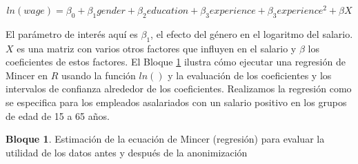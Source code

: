 \documentclass[
]{book}
\theoremstyle{definition}
\theoremstyle{definition}
\newtheorem{example}{Bloque}[chapter]
\theoremstyle{definition}
\theoremstyle{definition}
\theoremstyle{remark}
\begin{document}
\[ln(wage)=β_0+β_1gender+β_2education+β_3experience+β_3experience^2+βX\]

El parámetro de interés aquí es \(β_1\), el efecto del género en el logaritmo del salario. \(X\) es una matriz con varios otros factores que influyen en el salario y \(β\) los coeficientes de estos factores. El Bloque \ref{exm:bloque10lbn} ilustra cómo ejecutar una regresión de Mincer en \(R\) usando la función \(ln()\) y la evaluación de los coeficientes y los intervalos de confianza alrededor de los coeficientes. Realizamos la regresión como se especifica para los empleados asalariados con un salario positivo en los grupos de edad de
15 a 65 años.

\begin{example}
\protect\hypertarget{exm:bloque10lbn}{}\label{exm:bloque10lbn}Estimación de la ecuación de Mincer (regresión) para evaluar la utilidad de los datos antes y después de la anonimización
\end{example}
\end{document}
